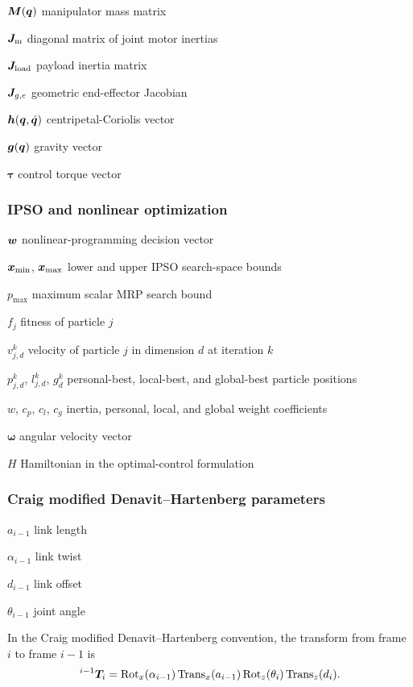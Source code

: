 $\bm{M}(\bm{q})$ manipulator mass matrix

$\bm{J}_{\mathrm{m}}$ diagonal matrix of joint motor inertias

$\bm{J}_{\mathrm{load}}$ payload inertia matrix

$\bm{J}_{g,e}$ geometric end-effector Jacobian

$\bm{h}(\bm{q},\dot{\bm{q}})$ centripetal-Coriolis vector

$\bm{g}(\bm{q})$ gravity vector

$\boldsymbol{\tau}$ control torque vector

\subsubsection*{IPSO and nonlinear optimization}

$\bm{w}$ nonlinear-programming decision vector

$\bm{x}_{\min}$, $\bm{x}_{\max}$ lower and upper IPSO search-space bounds

$p_{\max}$ maximum scalar MRP search bound

$f_j$ fitness of particle $j$

$v_{j,d}^{k}$ velocity of particle $j$ in dimension $d$ at iteration $k$

$p_{j,d}^{k}$, $l_{j,d}^{k}$, $g_d^{k}$ personal-best, local-best, and global-best particle positions

$w$, $c_p$, $c_l$, $c_g$ inertia, personal, local, and global weight coefficients

$\boldsymbol{\omega}$ angular velocity vector

$H$ Hamiltonian in the optimal-control formulation

\subsubsection*{Craig modified Denavit--Hartenberg parameters}

$a_{i-1}$ link length

$\alpha_{i-1}$ link twist

$d_{i-1}$ link offset

$\theta_{i-1}$ joint angle

In the Craig modified Denavit--Hartenberg convention, the transform from frame
$i$ to frame $i-1$ is
\begin{equation}
  {}^{i-1}\bm{T}_{i} =
  \mathrm{Rot}_{x}(\alpha_{i-1})\,
  \mathrm{Trans}_{x}(a_{i-1})\,
  \mathrm{Rot}_{z}(\theta_i)\,
  \mathrm{Trans}_{z}(d_i).
\end{equation}


\section{\nameCaAcronyms}
\label{sc:abbreviationsAndAcronyms}
\printacronyms[name={}, heading=none]
